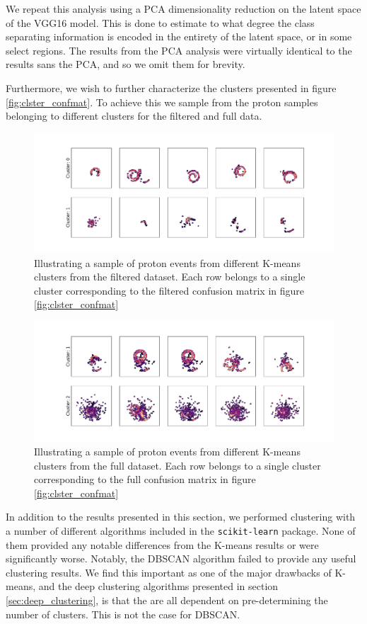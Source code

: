 We repeat this analysis using a PCA dimensionality reduction on the latent space of the VGG16 model. This is done to estimate to what degree the class separating information is encoded in the entirety of the latent space, or in some select regions. The results from the PCA analysis were virtually identical to the results sans the PCA, and so we omit them for brevity. 

Furthermore, we wish to further characterize the clusters presented in figure \ref{fig:clster_confmat}. To achieve this we sample from the proton samples belonging to different clusters for the filtered and full data.

\begin{figure}
\includegraphics[width=\textwidth]{plots/filtered_vgg_cluster_repr.pdf}
\caption[Filtered proton samples by cluster belonging]{Illustrating a sample of proton events from different K-means clusters from the filtered dataset. Each row belongs to a single cluster corresponding to the filtered confusion matrix in figure \ref{fig:clster_confmat}}\label{fig:filtered_vgg_clster_repr}
\end{figure} 

\begin{figure}
\includegraphics[width=\textwidth]{plots/full_vgg_cluster_repr.pdf}
\caption[Full proton samples by cluster belonging]{Illustrating a sample of proton events from different K-means clusters from the full dataset. Each row belongs to a single cluster corresponding to the full confusion matrix in figure \ref{fig:clster_confmat}}\label{fig:full_vgg_clster_repr}
\end{figure} 

In addition to the results presented in this section, we performed clustering with a number of different algorithms included in the \lstinline{scikit-learn} package. None of them provided any notable differences from the K-means results or were significantly worse. Notably, the DBSCAN algorithm failed to provide any useful clustering results. We find this important as one of the major drawbacks of K-means, and the deep clustering algorithms presented in section \ref{sec:deep_clustering}, is that the are all dependent on pre-determining the number of clusters. This is not the case for DBSCAN. 